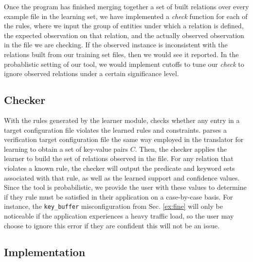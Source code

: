 Once the program has finished merging together a set of built relations over every example file in the learning set, we have implemented a \textit{check} function for each of the rules, where we input the group of entities under which a relation is defined, the expected observation on that relation, and the actually observed observation in the file we are checking. If the observed instance is inconsistent with the relations built from our training set files, then we would see it reported. In the probablistic setting of our tool, we would implement cutoffs to tune our \textit{check} to ignore observed relations under a certain significance level.

\subsection{Checker}
\label{sec-checker}

With the rules generated by the learner module, \app checks whether any entry in a target configuration file violates the learned rules and constraints.
\app parses a verification target configuration file the same way employed in the translator for learning to obtain a set of key-value pairs $C$.
Then, the checker applies the learner to build the set of relations observed in the file.
For any relation that violates a known rule, the checker will output the predicate and keyword sets associated with that rule, as well as the learned support and confidence values.
Since the tool is probabilistic, we provide the user with these values to determine if they rule must be satisfied in their application on a case-by-case basis.
For instance, the \texttt{key\_buffer} misconfiguration from Sec. \ref{ex:fine} will only be noticeable if the application experiences a heavy traffic load, so the user may choose to ignore this error if they are confident this will not be an issue.


\subsection{Implementation}


